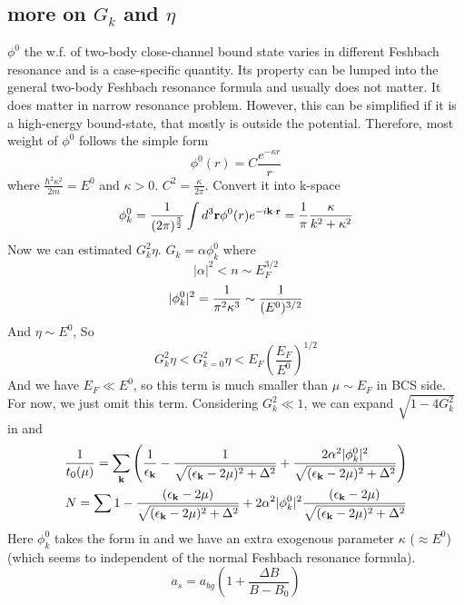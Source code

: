 \subsection{more on $G_{k}$ and $\eta$}
$\phi^{0}$ the w.f. of two-body close-channel bound state varies in different Feshbach resonance and is a case-specific quantity.  Its property can be lumped into the general two-body Feshbach resonance formula and usually does not matter.  It does matter in narrow resonance problem.  However, this can be simplified if it is a high-energy bound-state, that mostly is outside the potential.  Therefore, most weight of $\phi^{0}$ follows the simple form 
\[
\phi^{0}(r)=C\frac{e^{-\kappa{r}}}{r}
\]
 where $\frac{\hbar^{2}\kappa^{2}}{2m}=E^{0}$ and $\kappa>0$.  $C^{2}=\frac{\kappa}{2\pi}$.  Convert it into k-space
 \begin{equation}\label{eq:20101011:phi}
\phi^{0}_k=\frac{1}{(2\pi)^{\frac32}}\int{d^{3}\ensuremath{\mathbf{r}}\phi^{0}(r)e^{-i\ensuremath{\mathbf{k}}\cdot\ensuremath{\mathbf{r}}}}=\frac{1}{\pi}\frac{\kappa}{k^{2}+\kappa^{2}}
\end{equation}
Now we can estimated $G_{k}^{2}\eta$. $G_{k}=\alpha\phi^{0}_{k}$ where 
\[|\alpha|^{2}<n\sim{E_{F}^{3/2}}\]
\[
\lvert{\phi^{0}_{k}}\rvert^{2}=\frac{1}{\pi^{2}\kappa^{3}}\sim\frac{1}{(E^{0})^{3/2}}
\]
And $\eta\sim{E^{0}}$, So 
\[
G_{k}^{2}\eta<G_{k=0}^{2}\eta<E_{F}(\frac{E_{F}}{E^{0}})^{1/2}
\]
And we have $E_{F}\ll{E^{0}}$, so this term is much smaller than $\mu\sim{E_{F}}$ in BCS side. For now, we just omit this term.  Considering $G_{k}^{2}\ll1$, we can expand $\sqrt{1-4G_{k}^{2}}$ in  and  
\begin{gather}
\frac{1}{{t_{0}}(\mu)}=\sum_{\mathbf{k}}
\left(\frac{1}{\epsilon_{\mathbf{k}}}-\frac{1}{\sqrt{{(\epsilon_{\mathbf{k}}-2\mu)^{2}+\Delta^{2}}}}
+\frac{2\alpha^{2}|\phi^{0}_{k}|^{2}}{\sqrt{{(\epsilon_{\mathbf{k}}-2\mu)^{2}+\Delta^{2}}}}\right)\label{eq:20101011:gapa}
\\
N=\sum{1-\frac{(\epsilon_{\ensuremath{\mathbf{k}}}-2\mu)}{{\sqrt{{(\epsilon_{\ensuremath{\mathbf{k}}}-2\mu)^{2}+\Delta^{2}}}}}
+2\alpha^{2}|\phi^{0}_{k}|^{2}\frac{(\epsilon_{\ensuremath{\mathbf{k}}}-2\mu)}{{\sqrt{{(\epsilon_{\ensuremath{\mathbf{k}}}-2\mu)^{2}+\Delta^{2}}}}}}
\label{eq:20101011:gapb}
\end{gather}
Here $\phi^{0}_{k}$ takes the form in  and we have an extra exogenous parameter $\kappa$ ($\approx{}E^{0}$) (which seems to independent of the normal Feshbach resonance formula).
\begin{equation}
a_{s}=a_{bg}(1+\frac{\Delta{B}}{B-B_{0}})
\end{equation}

